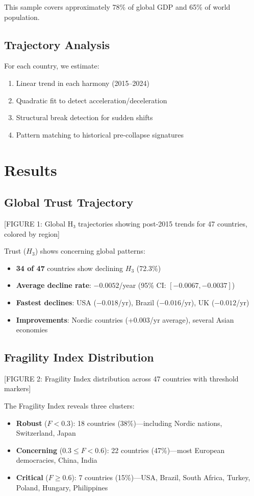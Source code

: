 \documentclass[11pt,a4paper]{article}
\begin{document}
This sample covers approximately 78\% of global GDP and 65\% of world population.

\subsection{Trajectory Analysis}

For each country, we estimate:
\begin{enumerate}
\item Linear trend in each harmony (2015--2024)
\item Quadratic fit to detect acceleration/deceleration
\item Structural break detection for sudden shifts
\item Pattern matching to historical pre-collapse signatures
\end{enumerate}

\section{Results}

\subsection{Global Trust Trajectory}

[FIGURE 1: Global H₃ trajectories showing post-2015 trends for 47 countries, colored by region]

Trust ($H_3$) shows concerning global patterns:
\begin{itemize}
\item \textbf{34 of 47} countries show declining $H_3$ (72.3\%)
\item \textbf{Average decline rate}: $-0.0052$/year (95\% CI: $[-0.0067, -0.0037]$)
\item \textbf{Fastest declines}: USA ($-0.018$/yr), Brazil ($-0.016$/yr), UK ($-0.012$/yr)
\item \textbf{Improvements}: Nordic countries (+0.003/yr average), several Asian economies
\end{itemize}

\subsection{Fragility Index Distribution}

[FIGURE 2: Fragility Index distribution across 47 countries with threshold markers]

The Fragility Index reveals three clusters:
\begin{itemize}
\item \textbf{Robust} ($F < 0.3$): 18 countries (38\%)---including Nordic nations, Switzerland, Japan
\item \textbf{Concerning} ($0.3 \leq F < 0.6$): 22 countries (47\%)---most European democracies, China, India
\item \textbf{Critical} ($F \geq 0.6$): 7 countries (15\%)---USA, Brazil, South Africa, Turkey, Poland, Hungary, Philippines
\end{itemize}
\end{document}
